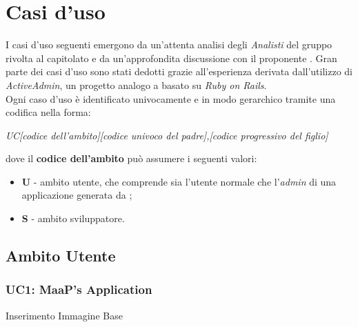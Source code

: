 \section{Casi d'uso}
I casi d'uso seguenti emergono da un'attenta analisi degli \textit{Analisti} del gruppo \GroupName{} rivolta al capitolato e da un'approfondita discussione con il proponente \Proponente{}. Gran parte dei casi d'uso sono stati dedotti grazie all'esperienza derivata dall'utilizzo di \textit{ActiveAdmin}, un progetto analogo a \ProjectName{} basato su \textit{Ruby on Rails}.\\
Ogni caso d'uso è identificato univocamente e in modo gerarchico tramite una codifica nella forma:

\begin{center}

\textit{UC[codice dell'ambito][codice univoco del padre],[codice progressivo del figlio]}

\end{center} 

dove il \textbf{codice dell'ambito} può assumere i seguenti valori:

\begin{itemize}

	\item \textbf{U} - ambito utente, che comprende sia l'utente normale che l'\textit{admin} di una applicazione generata da \ProjectName{};
	\item \textbf{S} - ambito sviluppatore.

\end{itemize}

\subsection{Ambito Utente}

\subsubsection{UC1: MaaP's Application}
		
Inserimento Immagine Base
			
